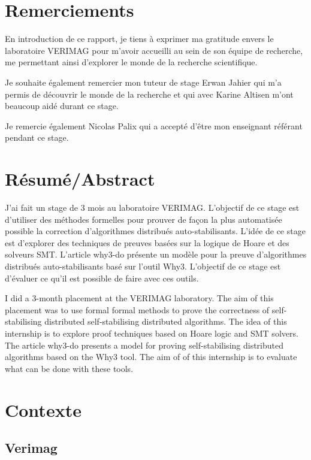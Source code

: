 \documentclass[11pt]{article}
\begin{document}
\setcounter{tocdepth}{5}
\tableofcontents

\section{Remerciements}
\label{sec:org6f88850}
  En introduction de ce rapport, je tiens à exprimer ma gratitude envers le laboratoire
VERIMAG pour m’avoir accueilli au sein de son équipe de recherche, me
permettant ainsi d’explorer le monde de la recherche scientifique.

Je souhaite également remercier mon tuteur de stage Erwan Jahier qui m'a permis de découvrir le 
monde de la recherche et qui avec Karine Altisen m'ont beaucoup aidé durant ce stage.

Je remercie également Nicolas Palix qui a accepté d’être mon enseignant référant pendant
ce stage. 

\section{Résumé/Abstract}
\label{sec:org97d8d19}
  J'ai fait un stage de 3 mois au laboratoire  VERIMAG. 
  L'objectif de ce stage est d'utiliser des méthodes formelles pour prouver de façon la plus automatisée possible la correction d'algorithmes distribués auto-stabilisants.
  L'idée de ce stage est d'explorer des techniques de preuves
basées sur la logique de Hoare et des solveurs SMT. 
L'article why3-do présente un modèle 
pour la preuve d'algorithmes distribués auto-stabilisants basé sur l'outil Why3.  
  L'objectif de ce stage  est d'évaluer ce qu'il est possible de faire avec ces outils.


I did a 3-month placement at the VERIMAG laboratory. The aim of this placement was to use formal
formal methods to prove the correctness of self-stabilising distributed
self-stabilising distributed algorithms. The idea of this internship is to explore proof techniques based on
Hoare logic and SMT solvers. The article why3-do presents a
model for proving self-stabilising distributed algorithms based on the Why3 tool. The aim of
of this internship is to evaluate what can be done with these tools.

\section{Contexte}
\label{sec:org3f64059}

\subsection{Verimag}
\label{sec:orgab4b0f1}
\end{document}
